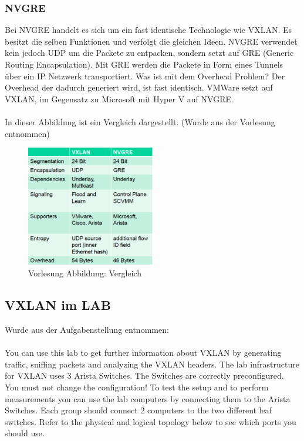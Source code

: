 \documentclass[a4,12pt]{scrartcl}
\begin{document}
\subsubsection{NVGRE}
Bei NVGRE handelt es sich um ein fast identische Technologie wie VXLAN. Es besitzt die selben Funktionen und verfolgt die gleichen Ideen. NVGRE verwendet kein jedoch UDP um die Packete zu entpacken, sondern setzt auf GRE (Generic Routing Encapsulation). Mit GRE werden die Packete in Form eines Tunnels über ein IP Netzwerk transportiert. Was ist mit dem Overhead Problem? Der Overhead der dadurch generiert wird, ist fast identisch. VMWare setzt auf VXLAN, im Gegensatz zu Microsoft mit Hyper V auf NVGRE. \\
\\
In dieser Abbildung ist ein Vergleich dargestellt. (Wurde aus der Vorlesung entnommen) 
\begin{figure} [H]
	\begin{center}
	\includegraphics[width=0.50\textwidth]{./pictures/vergleich_vxlan-nvgre.png}
	\caption{Vorlesung Abbildung: Vergleich}
	\label{x}
	\end{center}
\end{figure}

\subsection{VXLAN im LAB}
Wurde aus der Aufgabenstellung entnommen: \\
\\
You can use this lab to get further information about VXLAN by generating traffic, sniffing packets and analyzing the VXLAN headers. The lab infrastructure for VXLAN uses 3 Arista Switches. The Switches are correctly preconfigured. You must not change the configuration! To test the setup and to perform measurements you can use the lab computers by connecting them to the Arista Switches. Each group should connect 2 computers to the two different leaf switches. Refer to the physical and logical topology below to see which ports you should use.
\end{document}
